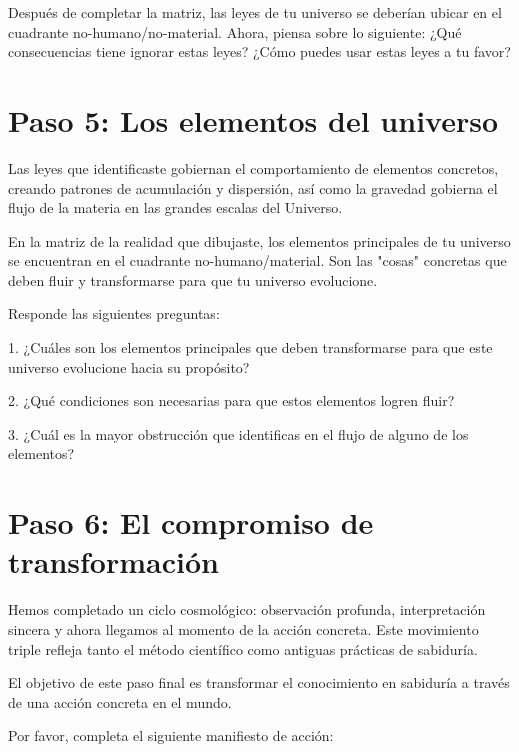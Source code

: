 \documentclass[statementpaper,oneside,article,10pt]{memoir}
\begin{document}
Después de completar la matriz, las leyes de tu universo se deberían ubicar en el cuadrante no-humano/no-material.
Ahora, piensa sobre lo siguiente: ¿Qué consecuencias tiene ignorar estas leyes? ¿Cómo puedes usar estas leyes a tu favor?
\vspace{2.5cm}


\newpage
\section{Paso 5: Los elementos del universo}
Las leyes que identificaste gobiernan el comportamiento de elementos concretos, creando patrones de acumulación y dispersión, así como la gravedad gobierna el flujo de la materia en las grandes escalas del Universo.

En la matriz de la realidad que dibujaste, los elementos principales de tu universo se encuentran en el cuadrante no-humano/material. Son las "cosas" concretas que deben fluir y transformarse para que tu universo evolucione.

Responde las siguientes preguntas:

1. ¿Cuáles son los elementos principales que deben transformarse para que este universo evolucione hacia su propósito?
\vspace{3cm}

2. ¿Qué condiciones son necesarias para que estos elementos logren fluir?
\vspace{3cm}

3. ¿Cuál es la mayor obstrucción que identificas en el flujo de alguno de los elementos?
\vspace{3cm}





\newpage
\section{Paso 6: El compromiso de transformación}
Hemos completado un ciclo cosmológico: observación profunda, interpretación sincera y ahora llegamos al momento de la acción concreta. Este movimiento triple refleja tanto el método científico como antiguas prácticas de sabiduría.

El objetivo de este paso final es transformar el conocimiento en sabiduría a través de una acción concreta en el mundo.

Por favor, completa el siguiente manifiesto de acción:
\end{document}
